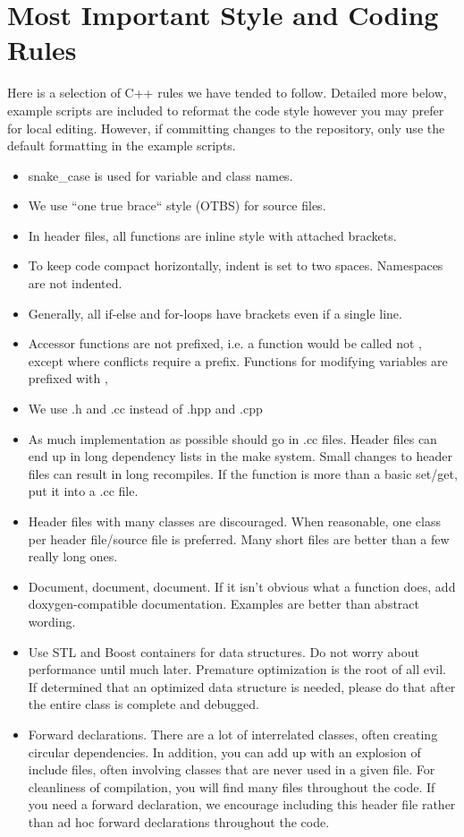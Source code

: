 \section{Most Important Style and Coding Rules}\label{sec:stylerules}
Here is a selection of C++ rules we have tended to follow.  
Detailed more below, example scripts are included to reformat the code style however you may prefer for local editing.
However, if committing changes to the repository, only use the default formatting in the example scripts.
\begin{itemize}
\item snake\_case is used for variable and class names.
\item We use ``one true brace`` style (OTBS) for source files. 
\item In header files, all functions are inline style with attached brackets.
\item To keep code compact horizontally, indent is set to two spaces. Namespaces are not indented.
\item Generally, all if-else and for-loops have brackets even if a single line.
\item Accessor functions are not prefixed, i.e. a function would be called  not , except
where conflicts require a prefix. Functions for modifying variables are prefixed with ,
\item We use .h and .cc instead of .hpp and .cpp
\item As much implementation as possible should go in .cc files.
	Header files can end up in long dependency lists in the make system.  
	Small changes to header files can result in long recompiles.
	If the function is more than a basic set/get, put it into a .cc file.
\item Header files with many classes are discouraged.  When reasonable, one class per header file/source file is preferred.
	 Many short files are better than a few really long ones.
\item Document, document, document.  If it isn't obvious what a function does, add doxygen-compatible documentation.
	Examples are better than abstract wording.
\item Use STL and Boost containers for data structures.  Do not worry about performance until much later.
	Premature optimization is the root of all evil. If determined that an optimized data structure is needed,
	please do that after the entire class is complete and debugged.
\item Forward declarations.  There are a lot of interrelated classes, often creating circular dependencies. In addition, you can add up with an explosion of include files, often involving classes that are never used in a given  file.  For cleanliness of compilation, you will find many  files throughout the code. If you need a forward declaration, we encourage including this header file rather than ad hoc forward declarations throughout the code.
\end{itemize}


